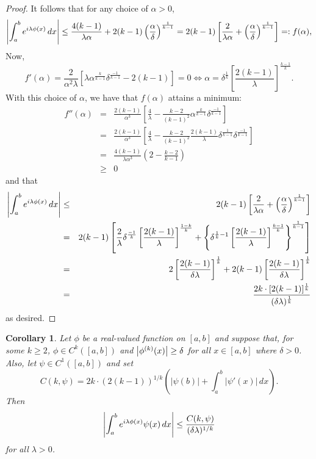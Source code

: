 \documentclass[11pt]{article}
\newtheorem{corollary}[theorem]{Corollary}
\newcommand{\lp}{\left(}
\newcommand{\rp}{\right)}
\newcommand{\lb}{\left[}
\newcommand{\rb}{\right]}
\newcommand{\lc}{\left\{}
\newcommand{\rc}{\right\}}
\newcommand{\f}[2]{\frac{#1}{#2}}
\newcommand{\al}{\alpha}
\begin{document}
\begin{proof}
It follows that for any choice of $\al > 0$,
\begin{equation*}
    \abs{\int_a^b e^{i\lambda \phi(x)} \,dx}  \leq \f{4(k-1)}{\lambda\alpha} + 2(k-1)\lp\f{\al}{\delta}\rp^{\f{1}{k-1}} = 2(k-1)\lb \f{2}{\lambda \alpha} +\lp  \f{\al}{\delta}\rp^{\f{1}{k-1}}   \rb =: f(\alpha),
\end{equation*}
Now, 
\begin{equation*}
    f'(\alpha) = \frac{2 }{\alpha ^2 \lambda }\left[
    \lambda \alpha^{\f{k}{k-1}} \delta^{\f{-1}{k-1}}
    -2(k-1)\right] =  0 \iff \al = \delta^{\f{1}{k}} \lb \f{2(k-1)}{\lambda} \rb^{\f{k-1}{k}} .
\end{equation*}
With this choice of $\al$, we have that $f(\al)$ attains a minimum:
\begin{eqnarray*}
    f''(\al) 
    &=&  \frac{2 (k-1)
   }{\alpha ^3} \left[\frac{4}{\lambda
   }-\frac{ k-2}{(
   k-1)^2} \alpha^{\f{k}{k-1}} \delta^{\frac{-1}{k-1}} \right]\\
   &=& \frac{2 (k-1)
   }{\alpha ^3} \left[\frac{4}{\lambda
   }-\frac{ k-2}{(
   k-1)^2}  \f{2(k-1)}{\lambda} \delta^{\f{1}{k-1}} \delta^{\frac{-1}{k-1}} \right]\\
   &=& \frac{4 (k-1)
   }{\lambda\alpha ^3} \left(2-\frac{ k-2}{
   k-1}  \right)\\
   &\geq& 0
\end{eqnarray*}
and that
\begin{eqnarray*}
    \abs{\int_a^b e^{i\lambda \phi(x)} \,dx}  
    &\leq& 2(k-1)\lb \f{2}{\lambda \alpha} +\lp  \f{\al}{\delta}\rp^{\f{1}{k-1}}   \rb\\
    &=&  2(k-1)\lb \f{2}{\lambda}\delta^{\f{-1}{k}}\lb \f{2(k-1)}{\lambda} \rb^{\f{1-k}{k}} +  \lc \delta^{\f{1}{k}-1} \lb \f{2(k-1)}{\lambda} \rb^{\f{k-1}{k}} \rc^{\f{1}{k-1}}\rb \\
    &=& 2\lb \f{2(k-1)}{\delta\lambda} \rb^{\f{1}{k}} + 2(k-1)\lb \f{2(k-1)}{\delta\lambda}\rb^{\f{1}{k}} \\
    &=& \f{2k\cdot [2(k-1)]^{\f{1}{k}}}{(\delta\lambda)^{\f{1}{k}}}
\end{eqnarray*}
as desired. 
\hline
\end{proof}




\begin{corollary}
Let $\phi$ be a real-valued function on $[a,b]$ and suppose that, for some $k\geq 2$, $\phi\in C^k([a,b])$ and $\abs{\phi^{(k)}(x)} \geq \delta$ for all $x\in [a,b]$ where $\delta>0$. Also, let $\psi\in C^1([a,b])$ and set
\begin{equation*}
C(k,\psi)=2k\cdot(2(k-1))^{1/k}\left(|\psi(b)|+\int_a^b|\psi'(x)|\,dx\right).
\end{equation*}
Then
\begin{equation*}
    \abs{\int_a^b e^{i\lambda \phi(x)} \psi(x) \,dx} \leq \frac{C(k,\psi)}{(\delta \lambda)^{1/k}}
\end{equation*}
for all $\lambda>0$.
\end{corollary}
\end{document}
